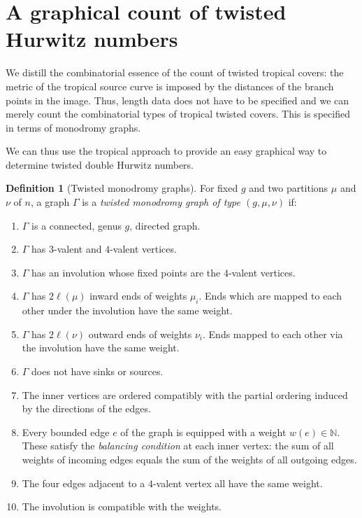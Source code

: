 \documentclass[10pt]{amsart}
\theoremstyle{plain}
\theoremstyle{definition}
\newtheorem{defi}[defi]{Definition}
\theoremstyle{definition}
\theoremstyle{plain}
\theoremstyle{plain}
\theoremstyle{remark}
\theoremstyle{plain}
\theoremstyle{plain}
\begin{document}
\section{A graphical count of twisted Hurwitz numbers}
\label{sec:monodr}
We distill the combinatorial essence of the count of twisted tropical covers: the metric of the tropical source curve is imposed by the distances of the branch points in the image. Thus, length data does not have to be specified and we can merely count the combinatorial types of tropical twisted covers. This is specified in terms of monodromy graphs.

We can thus use the tropical approach to provide an easy graphical way to determine twisted double Hurwitz numbers.

\begin{defi}[Twisted monodromy graphs]
\label{def-mongraph}
For fixed $g$ and two partitions $\mu$ and $\nu$ of $n$, a graph $\Gamma$ is a \emph{twisted monodromy graph of type $(g, \mu,\nu)$}  if:
\begin{enumerate}
\item $\Gamma$ is a connected, genus $g$, directed graph. 
\item $\Gamma$ has $3$-valent and $4$-valent vertices.
\item $\Gamma$ has an involution whose fixed points are the $4$-valent vertices.
\item $\Gamma$ has $2\ell(\mu)$ inward ends of weights $\mu_i$. Ends which are mapped to each other under the involution have the same weight.
\item $\Gamma$ has $2\ell(\nu)$ outward ends of weights $\nu_i$. Ends mapped to each other via the involution have the same weight.
\item $\Gamma$ does not have sinks or sources.
\item The inner vertices are ordered compatibly with the partial ordering induced by the directions of the edges.
\item Every bounded edge $e$ of the graph is equipped with a weight $w(e)\in \mathbb{N}$. These satisfy the \emph{balancing condition} at each inner vertex: the sum of all weights of  incoming  edges equals the sum of the weights of all outgoing edges.
\item The four edges adjacent to a $4$-valent vertex all have the same weight.
\item The involution is compatible with the weights.
\end{enumerate}
\end{defi}
\end{document}
